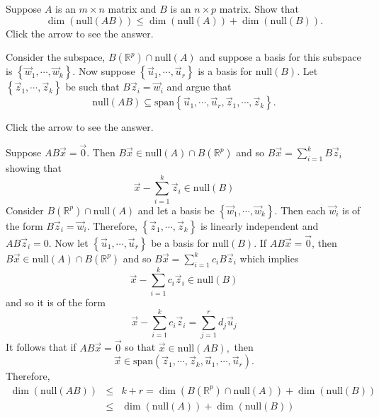 \documentclass{ximera}
\begin{document}
\begin{problem}\label{prb:5.30} Suppose $A$ is an $m\times n$ matrix and $B$ is an $n\times p$ matrix.
Show that
\begin{equation*}
\dim \left( \mbox{null} \left( AB\right) \right) \leq \dim \left( \mbox{null} \left(
A\right) \right) +\dim \left( \mbox{null} \left( B\right) \right) .
\end{equation*}
Click the arrow to see the answer.  
\begin{expandable}
Consider the subspace, $B\left( \mathbb{R}^{p}\right) \cap
\mbox{null} \left( A\right) $ and suppose a basis for this subspace is $\left\{
\vec{w}_{1},\cdots ,\vec{w}_{k}\right\} .$ Now suppose $\left\{
\vec{u}_{1},\cdots ,\vec{u}_{r}\right\} $ is a basis for $\mbox{null} \left(
B\right) .$ Let $\left\{ \vec{z}_{1},\cdots ,\vec{z}_{k}\right\} $ be
such that $B\vec{z}_{i}=\vec{w}_{i}$ and argue that
\begin{equation*}
\mbox{null} \left( AB\right) \subseteq \mbox{span}\left\{ \vec{u}_{1},\cdots ,
\vec{u}_{r},\vec{z}_{1},\cdots ,\vec{z}_{k}\right\} .
\end{equation*}

Click the arrow to see the answer.
\begin{expandable}
Suppose $AB\vec{x}=\vec{0}.$ Then $B\vec{x}\in \mbox{null}
\left( A\right) \cap B\left( \mathbb{R}^{p}\right) $ and so $B\vec{x}
=\sum_{i=1}^{k}B\vec{z}_{i}$ showing that
\[
\vec{x}-\sum_{i=1}^{k}\vec{z}_{i}\in \mbox{null} \left( B\right)
\]
Consider $B\left( \mathbb{R}^{p}\right) \cap \mbox{null} \left( A\right) $ and let
a basis be $\left\{ \vec{w}_{1},\cdots ,\vec{w}_{k}\right\} .$ Then
each $\vec{w}_{i}$ is of the form $B\vec{z}_{i}=\vec{w}_{i}$.
Therefore, $\left\{ \vec{z}_{1},\cdots ,\vec{z}_{k}\right\} $ is
linearly independent and $AB\vec{z}_{i}=0.$ Now let $\left\{ \vec{u}
_{1},\cdots ,\vec{u}_{r}\right\} $ be a basis for $\mbox{null} \left( B\right) .$
If $AB\vec{x}=\vec{0}$, then $B\vec{x} \in \mbox{null} \left( A\right) \cap B\left(
\mathbb{R}^{p}\right) $ and so $B\vec{x}=\sum_{i=1}^{k}c_{i}B\vec{z}
_{i}$ which implies
\[
\vec{x}-\sum_{i=1}^{k}c_{i}\vec{z}_{i}\in \mbox{null} \left( B\right)
\]
and so it is of the form
\[
\vec{x}-\sum_{i=1}^{k}c_{i}\vec{z}_{i}=\sum_{j=1}^{r}d_{j}\vec{u}
_{j}
\]
It follows that if $AB\vec{x}=\vec{0}$ so that $\vec{x}\in \mbox{null} \left(
AB\right) ,$ then
\[
\vec{x}\in \mbox{span}\left( \vec{z}_{1},\cdots ,\vec{z}_{k},
\vec{u}_{1},\cdots ,\vec{u}_{r}\right) .
\]
Therefore,
\begin{eqnarray*}
\dim \left( \mbox{null} \left( AB\right) \right)  &\leq &k+r=\dim \left( B\left(
\mathbb{R}^{p}\right) \cap \mbox{null} \left( A\right) \right) +\dim \left( \mbox{null}
\left( B\right) \right)  \\
&\leq &\dim \left( \mbox{null} \left( A\right) \right) +\dim \left( \mbox{null} \left(
B\right) \right)
\end{eqnarray*}
\end{expandable}
\end{expandable}
\end{problem}
\end{document}
